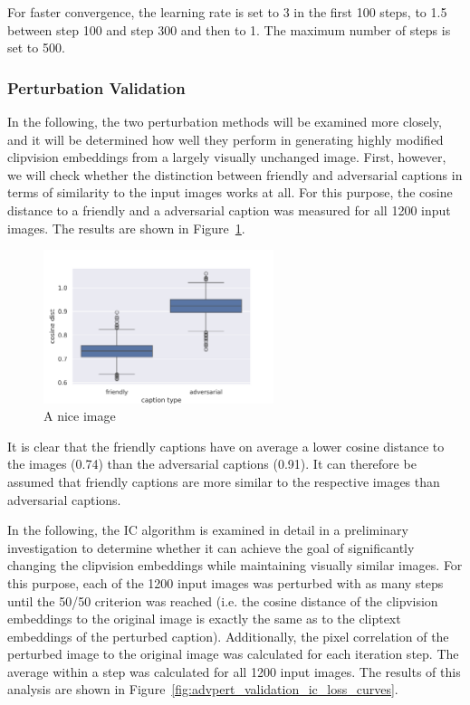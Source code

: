 For faster convergence, the learning rate is set to 3 in the first 100 steps, to 1.5 between step 100 and step 300 and then to 1. The maximum number of steps is set to 500.

\subsubsection{Perturbation Validation}

In the following, the two perturbation methods will be examined more closely, and it will be determined how well they perform in generating highly modified clipvision embeddings from a largely visually unchanged image. First, however, we will check whether the distinction between friendly and adversarial captions in terms of similarity to the input images works at all. For this purpose, the cosine distance to a friendly and a adversarial caption was measured for all 1200 input images. The results are shown in Figure~\ref{fig:advpert_sanity_check_friendly_vs_adversarial_cap}.

\begin{figure}[ht]
    \centering
    \includegraphics[width=0.6\textwidth]{plots/advpert_sanity_check_friendly_vs_adversarial_cap.png}
    \caption{A nice image}\label{fig:advpert_sanity_check_friendly_vs_adversarial_cap}
\end{figure}

It is clear that the friendly captions have on average a lower cosine distance to the images (0.74) than the adversarial captions (0.91). It can therefore be assumed that friendly captions are more similar to the respective images than adversarial captions. 

In the following, the IC algorithm is examined in detail in a preliminary investigation to determine whether it can achieve the goal of significantly changing the clipvision embeddings while maintaining visually similar images. For this purpose, each of the 1200 input images was perturbed with as many steps until the 50/50 criterion was reached (i.e. the cosine distance of the clipvision embeddings to the original image is exactly the same as to the cliptext embeddings of the perturbed caption). Additionally, the pixel correlation of the perturbed image to the original image was calculated for each iteration step. The average within a step was calculated for all 1200 input images. The results of this analysis are shown in Figure~\ref{fig:advpert_validation_ic_loss_curves}. 


